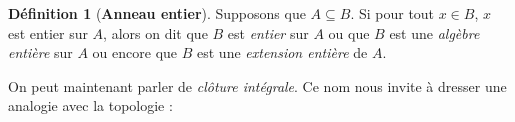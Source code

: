 \documentclass[10pt, twoside]{article}
\theoremstyle{plain}
\theoremstyle{definition}
\newtheorem{definition}[theorem]{Définition}
\theoremstyle{plain}
\theoremstyle{plain}
\theoremstyle{definition}
\theoremstyle{remark}
\begin{document}
\begin{definition}[\textbf{Anneau entier}]\label{def:ann entier}
    Supposons que $A \subseteq B$. Si pour tout $x \in B$, $x$ est entier sur $A$, alors on dit que $B$ est \textit{entier} sur $A$ ou que $B$ est une \textit{algèbre entière} sur $A$ ou encore que $B$ est une \textit{extension entière} de $A$.\\
\end{definition}

On peut maintenant parler de \textit{clôture intégrale}. Ce nom nous invite à dresser une analogie avec la topologie : 


\end{document}

